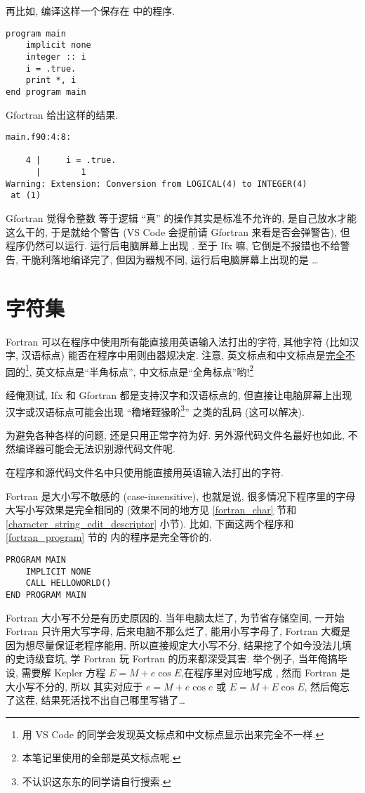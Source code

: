 再比如, 编译这样一个保存在  中的程序.
\begin{lstlisting}
program main
    implicit none
    integer :: i
    i = .true.
    print *, i
end program main
\end{lstlisting}
Gfortran 给出这样的结果.
\begin{verbatim}
main.f90:4:8:

    4 |     i = .true.
      |        1
Warning: Extension: Conversion from LOGICAL(4) to INTEGER(4)
 at (1)
\end{verbatim}
Gfortran 觉得令整数  等于逻辑 ``真'' 的操作其实是标准不允许的, 是自己放水才能这么干的, 于是就给个警告 (VS Code 会提前请 Gfortran 来看是否会弹警告), 但程序仍然可以运行. 运行后电脑屏幕上出现  . 至于 Ifx 嘛, 它倒是不报错也不给警告, 干脆利落地编译完了, 但因为器规不同, 运行后电脑屏幕上出现的是 \dots{}

\section{字符集}

Fortran 可以在程序中使用所有能直接用英语输入法打出的字符, 其他字符 (比如汉字, 汉语标点) 能否在程序中用则由器规决定. 注意, 英文标点和中文标点是\uline{完全不同}的\footnote{用 VS Code 的同学会发现英文标点和中文标点显示出来完全不一样.}, 英文标点是``半角标点'', 中文标点是``全角标点''哟!\footnote{本笔记里使用的全部是英文标点呢.}

经俺测试, Ifx 和 Gfortran 都是支持汉字和汉语标点的, 但直接让电脑屏幕上出现汉字或汉语标点可能会出现 ``穞堵臸猭畍\footnote{不认识这东东的同学请自行搜索.}'' 之类的乱码 (这可以解决).

为避免各种各样的问题, 还是只用正常字符为好. 另外源代码文件名最好也如此, 不然编译器可能会无法识别源代码文件呢.
\begin{convention}
    在程序和源代码文件名中只使用能直接用英语输入法打出的字符.\label{english_character_convention}
\end{convention}

Fortran 是大小写不敏感的 (case-insensitive), 也就是说, 很多情况下程序里的字母大写小写效果是完全相同的 (效果不同的地方见 \ref{fortran_char} 节和 \ref{character_string_edit_descriptor} 小节). 比如, 下面这两个程序和 \ref{fortran_program} 节的  内的程序是完全等价的.
\begin{lstlisting}
PROGRAM MAIN
    IMPLICIT NONE
    CALL HELLOWORLD()
END PROGRAM MAIN
\end{lstlisting}

Fortran 大小写不分是有历史原因的. 当年电脑太烂了, 为节省存储空间, 一开始 Fortran 只许用大写字母, 后来电脑不那么烂了, 能用小写字母了, Fortran 大概是因为想尽量保证老程序能用, 所以直接规定大小写不分, 结果挖了个如今没法儿填的史诗级奆坑, 学 Fortran 玩 Fortran 的历来都深受其害. 举个例子, 当年俺搞毕设, 需要解 Kepler 方程 $E=M+e\cos E$,在程序里对应地写成 , 然而 Fortran 是大小写不分的, 所以  其实对应于 $e=M+e\cos e$ 或 $E=M+E\cos E$, 然后俺忘了这茬, 结果死活找不出自己哪里写错了\dots{}

